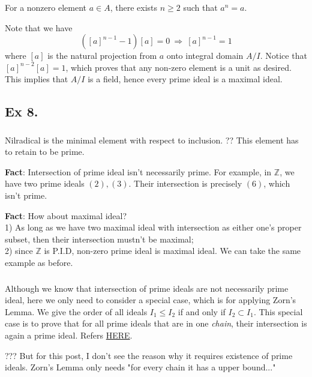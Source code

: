 For a nonzero element $a\in A$, there exists $n\geq 2$ such that $a^n=a$.

Note that we have 
$$([a]^{n-1}-1)[a]=0 ~\Rightarrow~ [a]^{n-1}=1$$ where $[a]$ is the natural projection from $a$ onto integral domain $A/I$. Notice that $[a]^{n-2}[a]=1$, which proves that any non-zero element is a unit as desired. This implies that $A/I$ is a field, hence every prime ideal is a maximal ideal.



\subsection{Ex 8.}\label{Atiyah Chapter 1 Ex 8.}

\subsubsection{}
Nilradical is the minimal element with respect to inclusion. ?? This element has to retain to be prime.

\textbf{Fact}: Intersection of prime ideal isn't necessarily prime. For example, in $\mathbb Z$, we have two prime ideals $(2),(3)$. Their intersection is precisely $(6)$, which isn't prime.

\textbf{Fact}: How about maximal ideal?\\ 1) As long as we have two maximal ideal with intersection as either one's proper subset, then their intersection mustn't be maximal;\\ 2) since $\mathbb Z$ is P.I.D, non-zero prime ideal is maximal ideal. We can take the same example as before.

\subsubsection{}
Although we know that intersection of prime ideals are not necessarily prime ideal, here we only need to consider a special case, which is for applying Zorn's Lemma. We give the order of all ideals $I_1\leq I_2$ if and only if $I_2\subset I_1$. This special case is to prove that for all prime ideals that are in one \textit{chain}, their intersection is again a prime ideal. Refers \href{https://math.stackexchange.com/questions/944274/intersection-of-prime-ideals-in-a-chain-is-prime}{HERE}.

??? But for this post, I don't see the reason why it requires existence of prime ideals. Zorn's Lemma only needs "for every chain it has a upper bound..."


